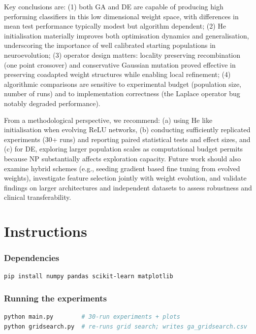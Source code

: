 \documentclass[12pt, a4paper]{article}
\begin{document}
Key conclusions are: (1) both GA and DE are capable of producing high performing classifiers in this low dimensional weight space, with differences in mean test performance typically modest but algorithm dependent; (2) He initialisation materially improves both optimisation dynamics and generalisation, underscoring the importance of well calibrated starting populations in neuroevolution; (3) operator design matters: locality preserving recombination (one point crossover) and conservative Gaussian mutation proved effective in preserving coadapted weight structures while enabling local refinement; (4) algorithmic comparisons are sensitive to experimental budget (population size, number of runs) and to implementation correctness (the Laplace operator bug notably degraded performance).

From a methodological perspective, we recommend: (a) using He like initialisation when evolving ReLU networks, (b) conducting sufficiently replicated experiments (30+ runs) and reporting paired statistical tests and effect sizes, and (c) for DE, exploring larger population scales as computational budget permits because NP substantially affects exploration capacity. Future work should also examine hybrid schemes (e.g., seeding gradient based fine tuning from evolved weights), investigate feature selection jointly with weight evolution, and validate findings on larger architectures and independent datasets to assess robustness and clinical transferability.

\section{Instructions}

\subsubsection*{Dependencies}
\begin{lstlisting}[language=bash]
pip install numpy pandas scikit-learn matplotlib
\end{lstlisting}

\subsubsection*{Running the experiments}
\begin{lstlisting}[language=bash]
python main.py        # 30-run experiments + plots
python gridsearch.py  # re-runs grid search; writes ga_gridsearch.csv
\end{lstlisting}
\end{document}
